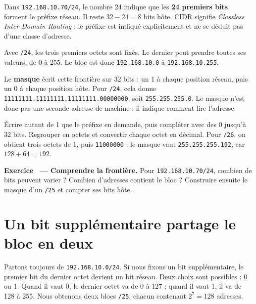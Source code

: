 \documentclass[11pt,a4paper]{article}
\newif\ifcorrige
\newcommand{\ip}[1]{\textcolor{ipred}{\texttt{#1}}}
\newcounter{exo}
\newcommand{\exo}[2]{%
  \Needspace{6cm}\stepcounter{exo}\begin{quest}\textbf{Exercice \theexo\ — #1.} #2\end{quest}}
\newcommand{\zone}[2]{%
  \ifcorrige
    \begin{tcolorbox}[colback=corrbg,colframe=corr,boxrule=0.6pt,arc=1pt,left=5pt,right=5pt,
      fontupper=\small\color{corr}]#2\end{tcolorbox}%
  \else
    \begin{tcolorbox}[colback=white,colframe=black!45,boxrule=0.5pt,arc=1pt,height=#1]\end{tcolorbox}%
  \fi}
\begin{document}
\begin{defi}
Dans \ip{192.168.10.70/24}, le nombre 24 indique que les \textbf{24 premiers bits} forment le
préfixe réseau. Il reste $32-24=8$ bits hôte. CIDR signifie
\emph{Classless Inter-Domain Routing} : le préfixe est indiqué explicitement et ne se déduit pas
d'une classe d'adresse.
\end{defi}

Avec \ip{/24}, les trois premiers octets sont fixés. Le dernier peut prendre toutes ses valeurs,
de 0 à 255. Le bloc est donc \ip{192.168.10.0} à \ip{192.168.10.255}.
\begin{center}
\end{center}

Le \textbf{masque} écrit cette frontière sur 32 bits : un 1 à chaque position réseau, puis un 0
à chaque position hôte. Pour \ip{/24}, cela donne
\texttt{11111111.11111111.11111111.00000000}, soit \ip{255.255.255.0}.
Le masque n'est donc pas une seconde adresse de machine : il indique comment lire l'adresse.

\begin{methode}
Écrire autant de 1 que le préfixe en demande, puis compléter avec des 0 jusqu'à 32 bits.
Regrouper en octets et convertir chaque octet en décimal.
Pour \ip{/26}, on obtient trois octets de 1, puis \texttt{11000000} :
le masque vaut \ip{255.255.255.192}, car $128+64=192$.
\end{methode}

\exo{Comprendre la frontière}{Pour \ip{192.168.10.70/24}, combien de bits peuvent varier ?
Combien d'adresses contient le bloc ? Construire ensuite le masque d'un \ip{/25} et compter ses bits hôte.}
\zone{1.8cm}{En /24, 8 bits peuvent varier, soit $2^8=256$ adresses.
En /25, le dernier octet du masque est \texttt{10000000}, soit 128 :
masque \ip{255.255.255.128}. Il reste 7 bits hôte.}

\Needspace{9cm}
\section{Un bit supplémentaire partage le bloc en deux}
Partons toujours de \ip{192.168.10.0/24}. Si nous fixons un bit supplémentaire, le premier bit
du dernier octet devient un bit réseau. Deux choix sont possibles : 0 ou 1.
Quand il vaut 0, le dernier octet va de 0 à 127 ; quand il vaut 1, il va de 128 à 255.
Nous obtenons deux blocs \ip{/25}, chacun contenant $2^7=128$ adresses.
\end{document}
